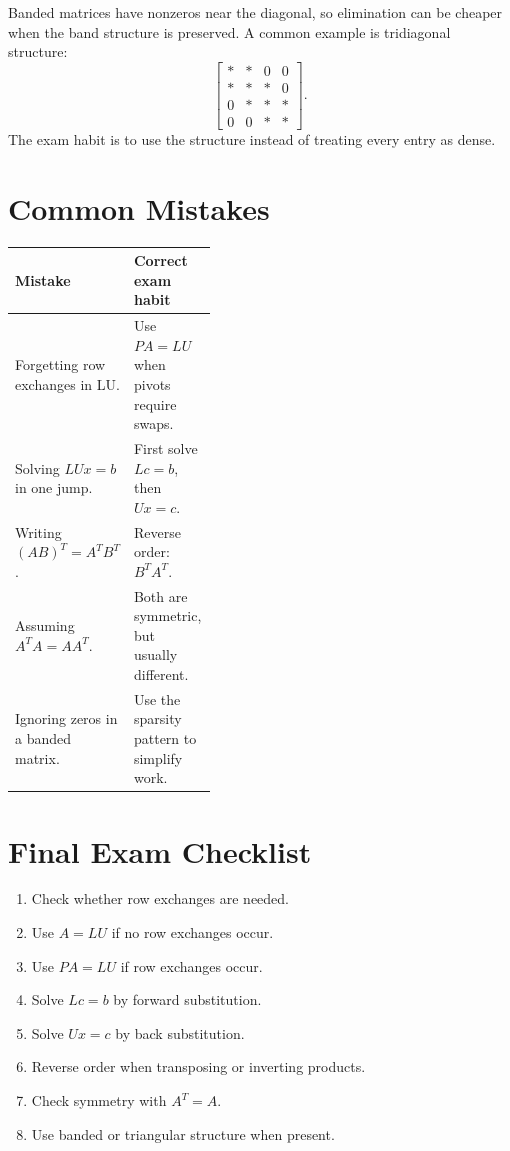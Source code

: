 \documentclass[10pt]{article}
\begin{document}
Banded matrices have nonzeros near the diagonal, so elimination can be cheaper when the band structure is preserved. A common example is tridiagonal structure:
\[
\begin{bmatrix}
*&*&0&0\\
*&*&*&0\\
0&*&*&*\\
0&0&*&*
\end{bmatrix}.
\]
The exam habit is to use the structure instead of treating every entry as dense.

\section{Common Mistakes}

\begin{center}
\small
\begin{tabularx}{\linewidth}{@{}L{0.40\linewidth}Y@{}}
\toprule
Mistake & Correct exam habit \\
\midrule
Forgetting row exchanges in LU. & Use \(PA=LU\) when pivots require swaps. \\
Solving \(LUx=b\) in one jump. & First solve \(Lc=b\), then \(Ux=c\). \\
Writing \((AB)^{T}=A^{T}B^{T}\). & Reverse order: \(B^{T}A^{T}\). \\
Assuming \(A^{T}A=A A^{T}\). & Both are symmetric, but usually different. \\
Ignoring zeros in a banded matrix. & Use the sparsity pattern to simplify work. \\
\bottomrule
\end{tabularx}
\end{center}

\section{Final Exam Checklist}

\begin{enumerate}
  \item Check whether row exchanges are needed.
  \item Use \(A=LU\) if no row exchanges occur.
  \item Use \(PA=LU\) if row exchanges occur.
  \item Solve \(Lc=b\) by forward substitution.
  \item Solve \(Ux=c\) by back substitution.
  \item Reverse order when transposing or inverting products.
  \item Check symmetry with \(A^{T}=A\).
  \item Use banded or triangular structure when present.
\end{enumerate}
\end{document}

